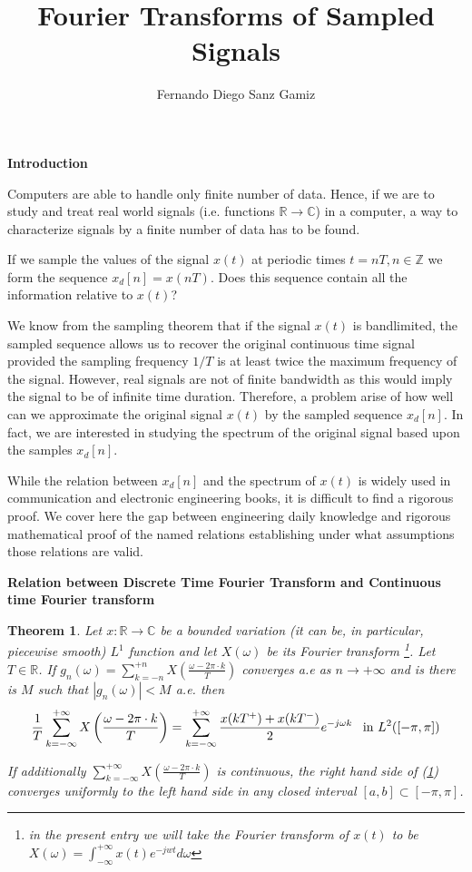 \documentclass[12pt]{article}
\newtheorem{thm}{Theorem}
\theoremstyle{definition}
\theoremstyle{remark}
\newcommand{\abs}[1]{\left\vert#1\right\vert}
\newcommand{\R}{\mathbb R}
\newcommand{\C}{\mathbb C}
\newcommand{\Z}{\mathbb Z}
\newcommand{\To}{\rightarrow}
\newcommand{\xd}{x_d[n]}
\newcommand{\xc}{x(t)}
\newcommand{\replica}[3]{\sum_{k=#2}^{#3} #1 \left(\frac{\omega- 2\pi \cdot k}{T}
\right)}
\newcommand{\DTFT}[1]{\sum_{k=-\infty}^{+\infty} \frac{#1(kT^+)+#1(kT^-)}{2} e^{-j\omega
k}}
\begin{document}
\title{Fourier Transforms of Sampled Signals}%
\author{Fernando Diego Sanz Gamiz}%

\textbf{Introduction}

Computers are able to handle only finite number of data. Hence, if
we are to study and treat real world signals (i.e. functions $\R \To
\C$) in a computer, a way to characterize signals by a finite number
of data has to be found.


\noindent If we sample the values of the signal $\xc$ at periodic
times $t=nT, n \in \Z$ we form the sequence $\xd=x(nT)$. Does this
sequence contain all the information relative to $\xc$?


\noindent We know from the sampling theorem that if the signal $\xc$
is bandlimited, the sampled sequence allows us to recover the
original continuous time signal provided the sampling frequency
$1/T$ is at least twice the maximum frequency of the signal. However,
real signals are not of finite bandwidth as this would imply the
signal to be of infinite time duration. Therefore, a problem arise
of how well can we approximate the original signal $\xc$ by the
sampled sequence $x_d[n]$. In fact, we are interested in studying
the spectrum of the original signal based upon the samples $\xd$.


\noindent While the relation between $\xd$ and the spectrum of $\xc$
is widely used in communication and electronic engineering books, it
is difficult to find a rigorous proof. We cover here the gap between
engineering daily knowledge and rigorous mathematical proof of the
named relations establishing under what assumptions those relations
are valid.


\textbf{Relation between Discrete Time Fourier Transform and Continuous time Fourier transform}

\begin{thm}
Let $x:\R \To \C$ be a bounded variation (it can be, in particular,
piecewise smooth) $L^1$ function and let $X(\omega)$ be its Fourier
transform \footnote{in the present entry we will take the Fourier
transform of $x(t)$ to be $X(\omega)=\int_{-\infty}^{+\infty}
x(t)e^{-jwt} d\omega$}. Let $T \in \R$. If $g_n(\omega)
=\replica{X}{-n}{+n}$ converges a.e as $n \To +\infty$ and is there
is $M$ such that $\abs{g_n(\omega)}<M$ a.e. then \label{eq1}
\begin{equation}
\frac {1}{T} \replica{X}{-\infty}{+\infty} = \DTFT{x} \mbox{\,\,\,
in } L^2([-\pi, \pi])
\end{equation}

If additionally $\replica{X}{-\infty}{+\infty}$ is continuous, the
right hand side of (\ref{eq1}) converges uniformly to the left hand
side in any closed interval $[a,b] \subset [-\pi, \pi]$.
\end{thm}
\end{document}
